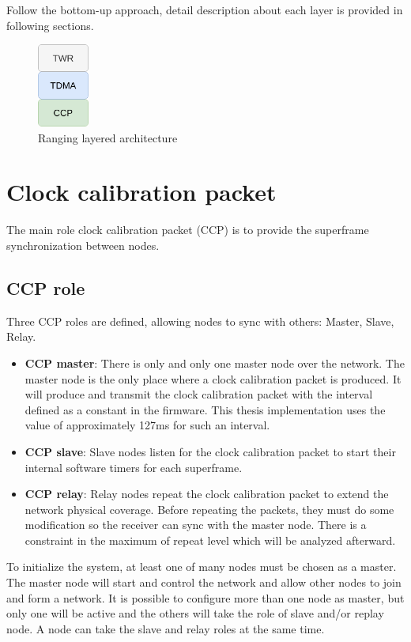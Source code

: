 \documentclass[\main/main.tex]{subfiles}
\begin{document}
Follow the bottom-up approach, detail description about each layer is provided in following sections.
\begin{figure}[H]
    \begin{center}
        \includegraphics[width=0.15\textwidth]{ranging_layered_architecture}
    \end{center}
    \caption{Ranging layered architecture}
    \label{fig:ranging_layered_architecture}
\end{figure}

\section{Clock calibration packet}
The main role clock calibration packet (CCP) is to provide the superframe synchronization between nodes. 
\subsection{CCP role}
Three CCP roles are defined, allowing nodes to sync with others: Master, Slave, Relay.
\begin{itemize}
    \item \textbf{CCP master}: There is only and only one master node over the network. The master node is the only place where a clock calibration packet is produced. It will produce and transmit the clock calibration packet with the interval defined as a constant in the firmware. This thesis implementation uses the value of approximately 127ms for such an interval. 
    \item \textbf{CCP slave}: Slave nodes listen for the clock calibration packet to start their internal software timers for each superframe.
    \item \textbf{CCP relay}: Relay nodes repeat the clock calibration packet to extend the network physical coverage. Before repeating the packets, they must do some modification so the receiver can sync with the master node. There is a constraint in the maximum of repeat level which will be analyzed afterward.
\end{itemize}

To initialize the system, at least one of many nodes must be chosen as a master. The master node will start and control the network and allow other nodes to join and form a network. It is possible to configure more than one node as master, but only one will be active and the others will take the role of slave and/or replay node. A node can take the slave and relay roles at the same time.
\end{document}

